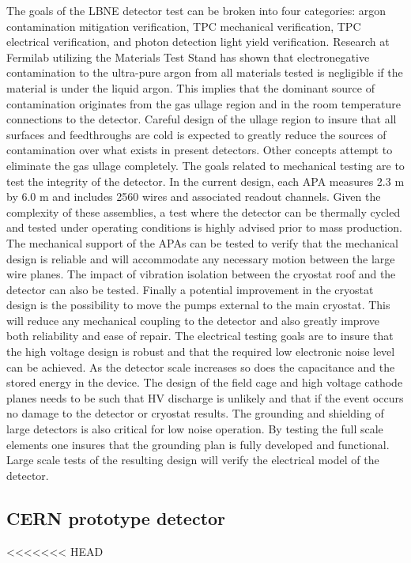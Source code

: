 The goals of the LBNE detector test can be broken into four categories: argon contamination mitigation verification, TPC mechanical verification, TPC electrical verification, and photon detection light yield verification. Research at Fermilab utilizing the Materials Test Stand has shown that electronegative contamination to the ultra-pure argon from all materials tested is negligible if the material is under the liquid argon. This implies that the dominant source of contamination originates from the gas ullage region and in the room temperature connections to the detector. Careful design of the ullage region to insure that all surfaces and feedthroughs are cold is expected to greatly reduce the sources of contamination over what exists in present detectors. Other concepts attempt to eliminate the gas ullage completely. The goals related to mechanical testing are to test the integrity of the detector. In the current design, each APA measures 2.3 m by 6.0 m and includes 2560 wires and associated readout channels. Given the complexity of these assemblies, a test where the detector can be thermally cycled and tested under operating conditions is highly advised prior to mass production. The mechanical support of the APAs can be tested to verify that the mechanical design is reliable and will accommodate any necessary motion between the large wire planes. The impact of vibration isolation between the cryostat roof and the detector can also be tested. Finally a potential improvement in the cryostat design is the possibility to move the pumps external to the main cryostat. This will reduce any mechanical coupling to the detector and also greatly improve both reliability and ease of repair. The electrical testing goals are to insure that the high voltage design is robust and that the required low electronic noise level can be achieved. As the detector scale increases so does the capacitance and the stored energy in the device. The design of the field cage and high voltage cathode planes needs to be such that HV discharge is unlikely and that if the event occurs no damage to the detector or cryostat results. The grounding and shielding of large detectors is also critical for low noise operation. By testing the full scale elements one insures that the grounding plan is fully developed and functional. Large scale tests of the resulting design will verify the electrical model of the detector. 


\subsection{CERN prototype detector}
<<<<<<< HEAD


